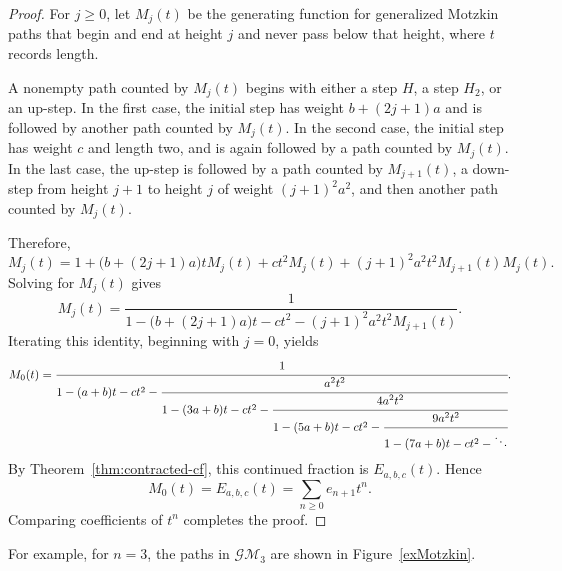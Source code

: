 \documentclass[11pt]{amsart}
\theoremstyle{plain}
\numberwithin{equation}{section}
\begin{document}
\begin{proof}
For $j\geq 0$, let $M_j(t)$ be the generating function for generalized
Motzkin paths that begin and end at height $j$ and never pass below
that height, where $t$ records length.

A nonempty path
counted by $M_j(t)$ begins with either a step $H$, a step $H_2$, or an
up-step. In the first case, the initial step has weight
$b+(2j+1)a$ and is followed by another path counted by $M_j(t)$. In
the second case, the initial step has weight $c$ and  length
two, and is again followed by a path counted by $M_j(t)$. In the last
case, the up-step is followed by a path counted by $M_{j+1}(t)$, a
down-step from height $j+1$ to height $j$ of weight $(j+1)^2a^2$, and
then another path counted by $M_j(t)$. 


Therefore,
\[
M_j(t)
=
1+\bigl(b+(2j+1)a\bigr)tM_j(t)
+ct^2M_j(t)
+(j+1)^2a^2t^2M_{j+1}(t)M_j(t).
\]
Solving for $M_j(t)$ gives
\[
M_j(t)
=
\frac{1}{
1-\bigl(b+(2j+1)a\bigr)t-ct^2
-(j+1)^2a^2t^2M_{j+1}(t)
}.
\]
Iterating this identity, beginning with $j=0$, yields
\[
M_0(t)
=
\cfrac{1}{
1-(a+b)t-ct^2-
\cfrac{a^2t^2}{
1-(3a+b)t-ct^2-
\cfrac{4a^2t^2}{
1-(5a+b)t-ct^2-
\cfrac{9a^2t^2}{
1-(7a+b)t-ct^2-\ddots
}
}
}
}.
\]
By Theorem~\ref{thm:contracted-cf}, this continued fraction is
$E_{a,b,c}(t)$. Hence
\[
M_0(t)
=
E_{a,b,c}(t)
=
\sum_{n\geq 0}e_{n+1}t^n.
\]
Comparing coefficients of $t^n$ completes the proof.
\end{proof}

For example, for $n=3$, the paths in $\mathcal{GM}_3$ are shown in Figure~\ref{exMotzkin}. 
\end{document}
